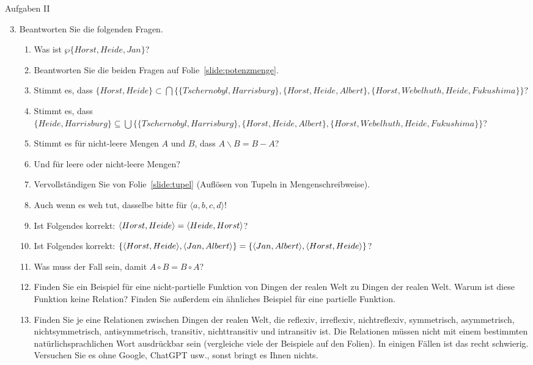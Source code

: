 \begin{frame}
  {Aufgaben II}
  \begin{enumerate}[<+->]\setcounter{enumi}{2}\scriptsize
    \item Beantworten Sie die folgenden Fragen.
      \Viertelzeile
      \begin{enumerate}[<+->]\scriptsize
        \item Was ist $\wp\{Horst,Heide,Jan\}$?
        \item Beantworten Sie die beiden Fragen auf Folie~\ref{slide:potenzmenge}.
        \item Stimmt es, dass $\{Horst,Heide\}\subset\bigcap\{\{Tschernobyl,Harrisburg\},\{Horst,Heide,Albert\},\{Horst,Webelhuth,Heide,Fukushima\}\}$?
        \item Stimmt es, dass $\{Heide,Harrisburg\}\subseteq\bigcup\{\{Tschernobyl,Harrisburg\},\{Horst,Heide,Albert\},\{Horst,Webelhuth,Heide,Fukushima\}\}$?
        \item Stimmt es für nicht-leere Mengen $A$ und $B$, dass $A\backslash B=B-A$?
        \item Und für leere oder nicht-leere Mengen?
        \item Vervollständigen Sie von Folie~\ref{slide:tupel}  (Auflösen von Tupeln in Mengenschreibweise).
        \item Auch wenn es weh tut, dasselbe bitte für $\langle a,b,c,d\rangle$!
        \item Ist Folgendes korrekt: $\langle{}Horst,Heide\rangle=\langle{}Heide,Horst\rangle$?
        \item Ist Folgendes korrekt: $\{\langle{}Horst,Heide\rangle,\langle{}Jan,Albert\rangle\}=\{\langle{}Jan,Albert\rangle,\langle{}Horst,Heide\rangle\}$?
        \item Was muss der Fall sein, damit $A\circ B=B\circ A$?
        \item Finden Sie ein Beispiel für eine nicht-partielle Funktion von Dingen der realen Welt zu Dingen der realen Welt. Warum ist diese Funktion keine Relation? Finden Sie außerdem ein ähnliches Beispiel für eine partielle Funktion.
        \item Finden Sie je eine Relationen zwischen Dingen der realen Welt, die reflexiv, irreflexiv, nichtreflexiv, symmetrisch, asymmetrisch, nichtsymmetrisch, antisymmetrisch, transitiv, nichttransitiv und intransitiv ist. Die Relationen müssen nicht mit einem bestimmten natürlichsprachlichen Wort ausdrückbar sein (vergleiche viele der Beispiele auf den Folien). In einigen Fällen ist das recht schwierig. Versuchen Sie es ohne Google, ChatGPT usw., sonst bringt es Ihnen nichts.
      \end{enumerate}
  \end{enumerate}
\end{frame}


